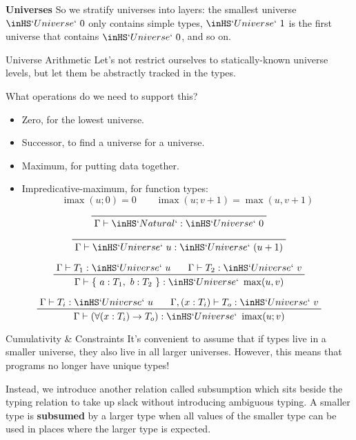 \documentclass[12pt]{article}
\DeclareMathOperator{\imax}{imax}
\begin{document}
\begin{posterbard}
\begin{posterbox}{\textbf{Universes}}
So we stratify universes into layers: the smallest universe \(\inHS`Universe`\ 0\) only contains simple types, \(\inHS`Universe`\ 1\) is the first universe that contains \(\inHS`Universe`\ 0\), and so on.
\end{posterbox}

\begin{posterbox}{Universe Arithmetic}
Let's not restrict ourselves to statically-known universe levels, but let them be abstractly tracked in the types.

What operations do we need to support this?
\begin{itemize}
\item Zero, for the lowest universe.
\item Successor, to find a universe for a universe.
\item Maximum, for putting data together.
\item Impredicative-maximum, for function types:
  \[\imax(u; 0) = 0 \qquad \imax(u; v+1) = \max(u, v+1)\]
\end{itemize}

\begin{displaymath}
\prftree{\Gamma \vdash \inHS`Natural` : \inHS`Universe`\ 0}
\end{displaymath}

\begin{displaymath}
\prftree{\Gamma \vdash \inHS`Universe`\ u : \inHS`Universe`\ (u+1)}
\end{displaymath}

\begin{displaymath}
\prftree{\Gamma \vdash T_1 : \inHS`Universe`\ u\quad}{\Gamma \vdash T_2 : \inHS`Universe`\ v}{\Gamma \vdash \{\ a : T_1,\ b : T_2\ \} : \inHS`Universe`\ \max(u,v)}
\end{displaymath}

\begin{displaymath}
\prftree{\Gamma \vdash T_i : \inHS`Universe`\ u\quad}{\Gamma, (x : T_i) \vdash T_o : \inHS`Universe`\ v}{\Gamma \vdash (\forall(x : T_i) \to T_o) : \inHS`Universe`\ \imax(u; v)}
\end{displaymath}
\end{posterbox}

\begin{posterbox}{Cumulativity \& Constraints}
It's convenient to assume that if types live in a smaller universe, they also live in all larger universes.
However, this means that programs no longer have unique types!

Instead, we introduce another relation called subsumption which sits beside the typing relation to take up slack without introducing ambiguous typing.
A smaller type is \textbf{subsumed} by a larger type when all values of the smaller type can be used in places where the larger type is expected.


\end{posterbox}
\end{posterbard}
\end{document}
